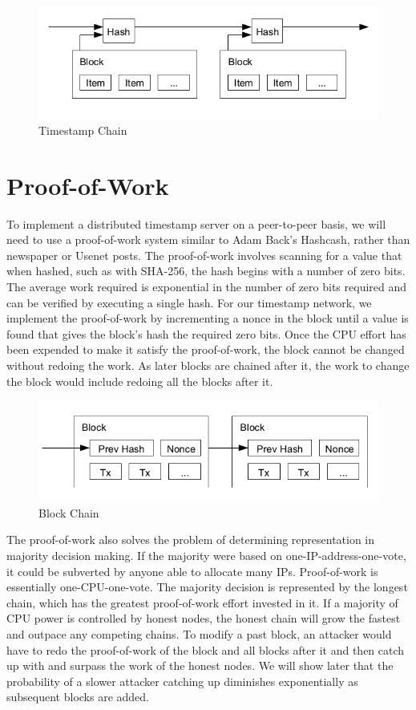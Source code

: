 \begin{figure}[ht!]
\centering
\includegraphics[trim = 0mm 0mm 0mm 0mm, width=120mm]{images/timestamp}
\caption{Timestamp Chain}
\end{figure}

\section{Proof-of-Work}

To implement a distributed timestamp server on a peer-to-peer basis, we will need to use a proof-of-work system similar to Adam Back's Hashcash, rather than newspaper or Usenet posts. The proof-of-work involves scanning for a value that when hashed, such as with SHA-256, the hash begins with a number of zero bits. The average work required is exponential in the number of zero bits required and can be verified by executing a single hash.
For our timestamp network, we implement the proof-of-work by incrementing a nonce in the block until a value is found that gives the block's hash the required zero bits. Once the CPU effort has been expended to make it satisfy the proof-of-work, the block cannot be changed without redoing the work. As later blocks are chained after it, the work to change the block would include redoing all the blocks after it.

\begin{figure}[ht!]
\centering
\includegraphics[trim = 0mm 0mm 0mm 0mm, width=120mm]{images/block_chain}
\caption{Block Chain}
\end{figure}

The proof-of-work also solves the problem of determining representation in majority decision making. If the majority were based on one-IP-address-one-vote, it could be subverted by anyone able to allocate many IPs. Proof-of-work is essentially one-CPU-one-vote. The majority decision is represented by the longest chain, which has the greatest proof-of-work effort invested in it. If a majority of CPU power is controlled by honest nodes, the honest chain will grow the fastest and outpace any competing chains. To modify a past block, an attacker would have to redo the proof-of-work of the block and all blocks after it and then catch up with and surpass the work of the honest nodes. We will show later that the probability of a slower attacker catching up diminishes exponentially as subsequent blocks are added.

